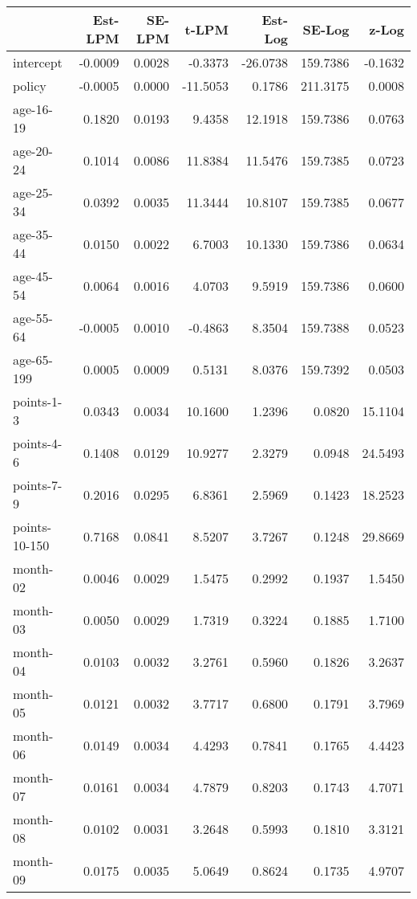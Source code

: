 \documentclass[10pt]{article}
\begin{document}
\begin{table}[ht]
\centering
\begin{tabular}{lrrrrrr}
  \hline
 & Est-LPM & SE-LPM & t-LPM & Est-Log & SE-Log & z-Log \\ 
  \hline
intercept & -0.0009 & 0.0028 & -0.3373 & -26.0738 & 159.7386 & -0.1632 \\ 
  policy & -0.0005 & 0.0000 & -11.5053 & 0.1786 & 211.3175 & 0.0008 \\ 
  age-16-19 & 0.1820 & 0.0193 & 9.4358 & 12.1918 & 159.7386 & 0.0763 \\ 
  age-20-24 & 0.1014 & 0.0086 & 11.8384 & 11.5476 & 159.7385 & 0.0723 \\ 
  age-25-34 & 0.0392 & 0.0035 & 11.3444 & 10.8107 & 159.7385 & 0.0677 \\ 
  age-35-44 & 0.0150 & 0.0022 & 6.7003 & 10.1330 & 159.7386 & 0.0634 \\ 
  age-45-54 & 0.0064 & 0.0016 & 4.0703 & 9.5919 & 159.7386 & 0.0600 \\ 
  age-55-64 & -0.0005 & 0.0010 & -0.4863 & 8.3504 & 159.7388 & 0.0523 \\ 
  age-65-199 & 0.0005 & 0.0009 & 0.5131 & 8.0376 & 159.7392 & 0.0503 \\ 
  points-1-3 & 0.0343 & 0.0034 & 10.1600 & 1.2396 & 0.0820 & 15.1104 \\ 
  points-4-6 & 0.1408 & 0.0129 & 10.9277 & 2.3279 & 0.0948 & 24.5493 \\ 
  points-7-9 & 0.2016 & 0.0295 & 6.8361 & 2.5969 & 0.1423 & 18.2523 \\ 
  points-10-150 & 0.7168 & 0.0841 & 8.5207 & 3.7267 & 0.1248 & 29.8669 \\ 
  month-02 & 0.0046 & 0.0029 & 1.5475 & 0.2992 & 0.1937 & 1.5450 \\ 
  month-03 & 0.0050 & 0.0029 & 1.7319 & 0.3224 & 0.1885 & 1.7100 \\ 
  month-04 & 0.0103 & 0.0032 & 3.2761 & 0.5960 & 0.1826 & 3.2637 \\ 
  month-05 & 0.0121 & 0.0032 & 3.7717 & 0.6800 & 0.1791 & 3.7969 \\ 
  month-06 & 0.0149 & 0.0034 & 4.4293 & 0.7841 & 0.1765 & 4.4423 \\ 
  month-07 & 0.0161 & 0.0034 & 4.7879 & 0.8203 & 0.1743 & 4.7071 \\ 
  month-08 & 0.0102 & 0.0031 & 3.2648 & 0.5993 & 0.1810 & 3.3121 \\ 
  month-09 & 0.0175 & 0.0035 & 5.0649 & 0.8624 & 0.1735 & 4.9707 \\ 

\end{tabular}
\end{table}
\end{document}
